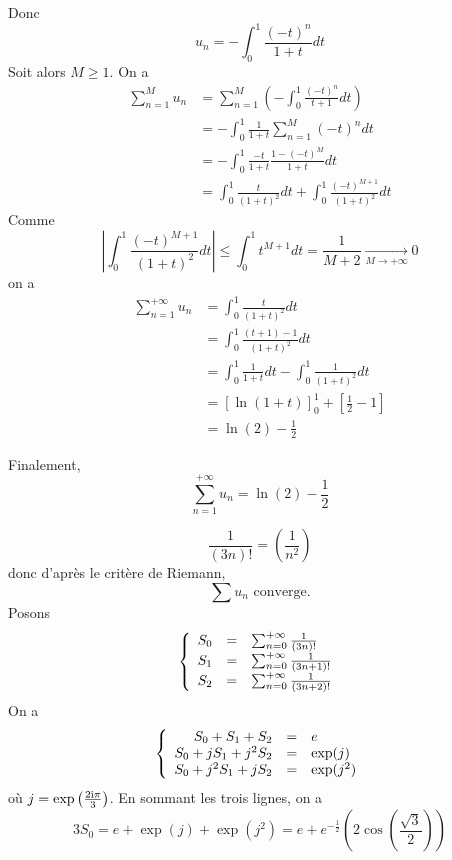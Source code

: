 \begin{solution}
	Donc 
	$$u_{n}=-\int_{0}^{1}\frac{(-t)^{n}}{1+t}dt$$
	Soit alors $M\geqslant1$. On a 
	\begin{align*}
		\sum_{n=1}^{M}u_{n}
		&=\sum_{n=1}^{M}\left(-\int_{0}^{1}\frac{(-t)^{n}}{t+1}dt\right)\\
		&=-\int_{0}^{1}\frac{1}{1+t}\sum_{n=1}^{M}(-t)^{n}dt\\
		&=-\int_{0}^{1}\frac{-t}{1+t}\frac{1-(-t)^{M}}{1+t}dt\\
		&=\int_{0}^{1}\frac{t}{(1+t)^{2}}dt+\int_{0}^{1}\frac{(-t)^{M+1}}{(1+t)^{2}}dt
	\end{align*}
	Comme 
	$$\left\vert\int_{0}^{1}\frac{(-t)^{M+1}}{(1+t)^{2}}dt\right\vert\leqslant\int_{0}^{1}t^{M+1}dt=\frac{1}{M+2}\xrightarrow[M\to+\infty]{}0$$
	on a 
	\begin{align*}
		\sum_{n=1}^{+\infty}u_{n}
		&=\int_{0}^{1}\frac{t}{(1+t)^{2}}dt\\
		&=\int_{0}^{1}\frac{(t+1)-1}{(1+t)^{2}}dt\\
		&=\int_{0}^{1}\frac{1}{1+t}dt-\int_{0}^{1}\frac{1}{(1+t)^{2}}dt\\
		&=\left[\ln\left(1+t\right)\right]_{0}^{1}+\left[\frac{1}{2}-1\right]\\
		&=\ln(2)-\frac{1}{2}
	\end{align*}

	Finalement, 
	$$\boxed{\sum_{n=1}^{+\infty} u_{n}=\ln(2)-\frac{1}{2}}$$

	\item $$\frac{1}{(3n)!}=\left(\frac{1}{n^{2}}\right)$$
	donc d'après le critère de Riemann, 
	$$\boxed{\sum u_{n}\text{ converge.}}$$
	Posons 
	$$
	\left\{
		\begin{array}[]{rcl}
			S_{0} &= &\sum_{n=0}^{+\infty}\frac{1}{(3n)!}\\
			S_{1} &= &\sum_{n=0}^{+\infty}\frac{1}{(3n+1)!}\\
			S_{2} &= &\sum_{n=0}^{+\infty}\frac{1}{(3n+2)!}
		\end{array}
	\right.
	$$
	On a 
	$$
	\left\{
		\begin{array}[]{rcl}
			S_{0} + S_{1} + S_{2} &= & e\\
			S_{0} + jS_{1} + j^{2}S_{2} &= &\exp(j)\\
			S_{0} + j^{2}S_{1} + jS_{2} &= &\exp(j^{2})
		\end{array}
	\right.
	$$
	où $j=\exp\left(\frac{2\mathrm{i} \pi}{3}\right)$.
	En sommant les trois lignes, on a 
	$$3S_{0}=e+\exp(j)+\exp(j^{2})=e+e^{-\frac{1}{2}}\left(2\cos\left(\frac{\sqrt{3}}{2}\right)\right)$$


\end{solution}
